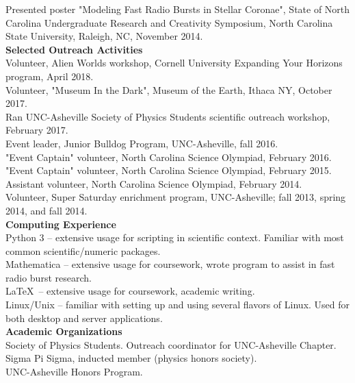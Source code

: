 \documentclass[a4paper, 11pt]{article}
\newcommand{\noi}{\noindent}
\begin{document}
\noi Presented poster "Modeling Fast Radio Bursts in Stellar Coronae", State of North Carolina Undergraduate Research and Creativity Symposium, North Carolina State University, Raleigh, NC, November 2014.
\\

\noi \textbf{Selected Outreach Activities}
\\

\noi Volunteer, Alien Worlds workshop, Cornell University Expanding Your Horizons program, April 2018.
\\

\noi Volunteer, "Museum In the Dark", Museum of the Earth, Ithaca NY, October 2017.
\\

\noi Ran UNC-Asheville Society of Physics Students scientific outreach workshop, February 2017.
\\

\noi Event leader, Junior Bulldog Program, UNC-Asheville, fall 2016. 
\\

\noi "Event Captain" volunteer, North Carolina Science Olympiad, February 2016.
\\

\noi "Event Captain" volunteer, North Carolina Science Olympiad, February 2015.
\\

\noi Assistant volunteer, North Carolina Science Olympiad, February 2014.
\\

\noi Volunteer, Super Saturday enrichment program, UNC-Asheville; fall 2013, spring 2014, and fall 2014.
\\


\noi \textbf{Computing Experience} 
\\

\noi Python 3 -- extensive usage for scripting in scientific context. Familiar with most common scientific/numeric packages.
\\

\noi Mathematica -- extensive usage for coursework, wrote program to assist in fast radio burst research.
\\

\noi \LaTeX \, -- extensive usage for coursework, academic writing.
\\

\noi Linux/Unix -- familiar with setting up and using several flavors of Linux. Used for both desktop and server applications.
\\

\noi \textbf{Academic Organizations}
\\

\noi Society of Physics Students. Outreach coordinator for UNC-Asheville Chapter.
\\

\noi Sigma Pi Sigma, inducted member (physics honors society).
\\

\noi UNC-Asheville Honors Program.
\end{document}
